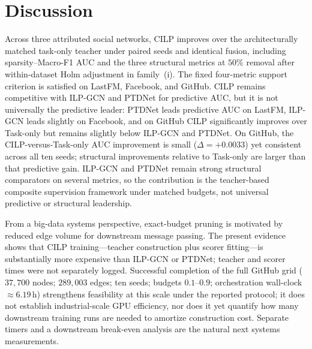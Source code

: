 \section{Discussion}
\label{sec:discussion}

Across three attributed social networks, CILP improves over the architecturally matched task-only teacher under paired seeds and identical fusion, including sparsity--Macro-F1 AUC and the three structural metrics at $50\%$ removal after within-dataset Holm adjustment in family~(i).
The fixed four-metric support criterion is satisfied on LastFM, Facebook, and GitHub.
CILP remains competitive with ILP-GCN and PTDNet for predictive AUC, but it is not universally the predictive leader: PTDNet leads predictive AUC on LastFM, ILP-GCN leads slightly on Facebook, and on GitHub CILP significantly improves over Task-only but remains slightly below ILP-GCN and PTDNet.
On GitHub, the CILP-versus-Task-only AUC improvement is small ($\Delta{=}{+}0.0033$) yet consistent across all ten seeds; structural improvements relative to Task-only are larger than that predictive gain.
ILP-GCN and PTDNet remain strong structural comparators on several metrics, so the contribution is the teacher-based composite supervision framework under matched budgets, not universal predictive or structural leadership.

From a big-data systems perspective, exact-budget pruning is motivated by reduced edge volume for downstream message passing.
The present evidence shows that CILP training---teacher construction plus scorer fitting---is substantially more expensive than ILP-GCN or PTDNet; teacher and scorer times were not separately logged.
Successful completion of the full GitHub grid ($37{,}700$ nodes; $289{,}003$ edges; ten seeds; budgets $0.1$--$0.9$; orchestration wall-clock $\approx6.19$\,h) strengthens feasibility at this scale under the reported protocol; it does not establish industrial-scale GPU efficiency, nor does it yet quantify how many downstream training runs are needed to amortize construction cost.
Separate timers and a downstream break-even analysis are the natural next systems measurements.

